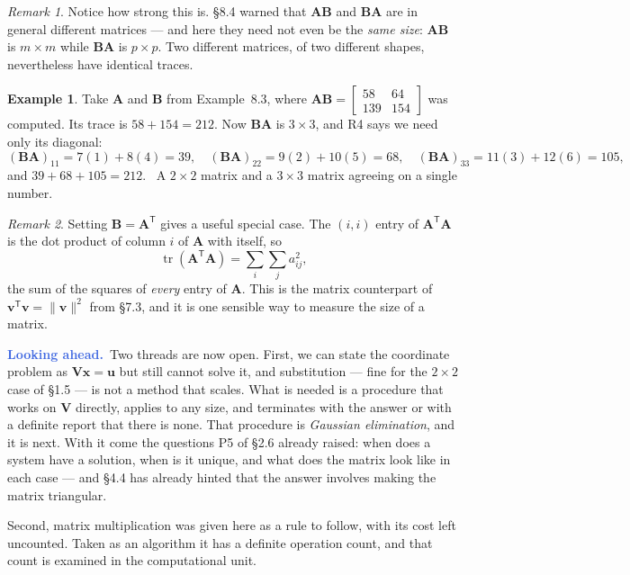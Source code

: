 \documentclass[11pt]{article}
\theoremstyle{plain}
\theoremstyle{definition}
\newtheorem{ex}{Example}[section]
\theoremstyle{remark}
\newtheorem*{rmk}{Remark}
\newcommand{\lookahead}{\par\smallskip\noindent
  \textbf{\sffamily\textcolor{RoyalBlue}{Looking ahead.}}\ \ignorespaces}
\newcommand{\vc}[1]{\mathbf{#1}}        %
\newcommand{\mt}[1]{\mathbf{#1}}        %
\newcommand{\norm}[1]{\lVert #1\rVert}
\newcommand{\T}{^{\mathsf{T}}}          %
\begin{document}
\begin{rmk}
Notice how strong this is. \S8.4 warned that $\mt{A}\mt{B}$ and $\mt{B}\mt{A}$
are in general different matrices --- and here they need not even be the
\emph{same size}: $\mt{A}\mt{B}$ is $m\times m$ while $\mt{B}\mt{A}$ is
$p\times p$. Two different matrices, of two different shapes, nevertheless have
identical traces.
\end{rmk}

\begin{ex}
Take $\mt{A}$ and $\mt{B}$ from Example~8.3, where
$\mt{A}\mt{B}=\begin{bmatrix}58&64\\139&154\end{bmatrix}$ was computed. Its
trace is $58+154=212$. Now $\mt{B}\mt{A}$ is $3\times3$, and R4 says we need
only its diagonal:
\[
  (\mt{B}\mt{A})_{11}=7(1)+8(4)=39,\quad
  (\mt{B}\mt{A})_{22}=9(2)+10(5)=68,\quad
  (\mt{B}\mt{A})_{33}=11(3)+12(6)=105,
\]
and $39+68+105=212$. \checkmark\ A $2\times2$ matrix and a $3\times3$ matrix
agreeing on a single number.
\end{ex}

\begin{rmk}
Setting $\mt{B}=\mt{A}\T$ gives a useful special case. The $(i,i)$ entry of
$\mt{A}\T\mt{A}$ is the dot product of column $i$ of $\mt{A}$ with itself, so
\[
  \operatorname{tr}(\mt{A}\T\mt{A})=\sum_{i}\sum_{j} a_{ij}^{2},
\]
the sum of the squares of \emph{every} entry of $\mt{A}$. This is the matrix
counterpart of $\vc{v}\T\vc{v}=\norm{\vc{v}}^{2}$ from \S7.3, and it is one
sensible way to measure the size of a matrix.
\end{rmk}

\lookahead Two threads are now open. First, we can state the coordinate problem
as $\mt{V}\vc{x}=\vc{u}$ but still cannot solve it, and substitution --- fine for
the $2\times2$ case of \S1.5 --- is not a method that scales. What is needed is a
procedure that works on $\mt{V}$ directly, applies to any size, and terminates
with the answer or with a definite report that there is none. That procedure is
\emph{Gaussian elimination}, and it is next. With it come the questions P5 of
\S2.6 already raised: when does a system have a solution, when is it unique, and
what does the matrix look like in each case --- and \S4.4 has already hinted that
the answer involves making the matrix triangular.

Second, matrix multiplication was given here as a rule to follow, with its cost
left uncounted. Taken as an algorithm it has a definite operation count, and
that count is examined in the computational unit.
\end{document}
